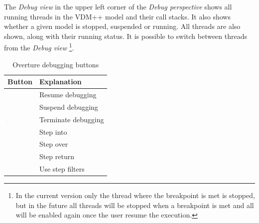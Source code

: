 The \emph{Debug view} in the upper left corner of the \emph{Debug
  perspective} shows all running threads in the VDM++ model and their
call stacks. It also shows whether a given model is stopped, suspended
or running. All threads are also shown, along with their running
status. It is possible to switch between threads from the \emph{Debug view}
\footnote{In the current version only the thread where the
  breakpoint is met is stopped, but in the future all threads will be
  stopped when a breakpoint is met and all will be enabled again once
  the user resume the execution.}.

\begin{table}
\begin{center}
\begin{tabular}{|l|l|}\hline \hline
\textbf{Button} & \textbf{Explanation} \\ \hline
\includegraphics[width=0.03\textwidth]{figures/resume} & Resume debugging \\
\includegraphics[width=0.03\textwidth]{figures/suspend} & Suspend debugging\\
\includegraphics[width=0.03\textwidth]{figures/terminate} & Terminate debugging\\
\includegraphics[width=0.03\textwidth]{figures/stepinto} & Step into\\
\includegraphics[width=0.03\textwidth]{figures/stepover} & Step over \\
\includegraphics[width=0.03\textwidth]{figures/stepreturn} & Step return\\
\includegraphics[width=0.03\textwidth]{figures/stepbystep} & Use step filters\\
\hline \hline
\end{tabular}
\caption{Overture debugging buttons\label{tab:debugButtons}}
\end{center}
\end{table}

